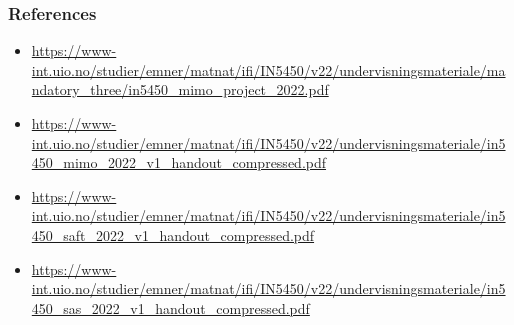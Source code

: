 \documentclass{beamer}
\begin{document}
\begin{frame}
	\frametitle{References}
	\begin{itemize}
		\item \url{https://www-int.uio.no/studier/emner/matnat/ifi/IN5450/v22/undervisningsmateriale/mandatory_three/in5450_mimo_project_2022.pdf}	
	
		\item \url{https://www-int.uio.no/studier/emner/matnat/ifi/IN5450/v22/undervisningsmateriale/in5450\_mimo\_2022\_v1\_handout\_compressed.pdf}
		
		\item \url{https://www-int.uio.no/studier/emner/matnat/ifi/IN5450/v22/undervisningsmateriale/in5450\_saft\_2022\_v1\_handout\_compressed.pdf}
		
		\item \url{https://www-int.uio.no/studier/emner/matnat/ifi/IN5450/v22/undervisningsmateriale/in5450\_sas\_2022\_v1\_handout\_compressed.pdf}
	\end{itemize}
\end{frame}
\end{document}
